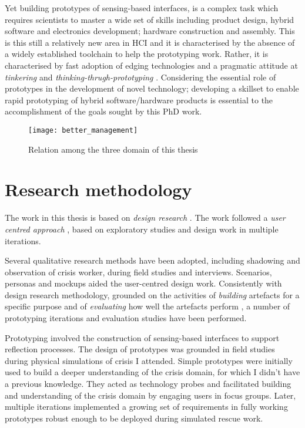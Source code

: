 Yet building prototypes of sensing-based interfaces, is a complex task which requires scientists to master a wide set of skills including product design, hybrid software and electronics development; hardware construction and assembly. This is this still a relatively new area in HCI and it is characterised by the absence of a widely established toolchain to help the prototyping work. Rather, it is characterised by fast adoption of edging technologies and a pragmatic attitude at \emph{tinkering} and \emph{thinking-thrugh-prototyping} \autocite{Klemmer:2006ez}. Considering the essential role of prototypes in the development of novel technology; developing a skillset to enable rapid prototyping of hybrid software/hardware products is essential to the accomplishment of the goals sought by this PhD work.
\begin{figure}
	[tbh] \centering 
	\texttt{[image: better\_management]} \caption{Relation among the three domain of this thesis} \label{fig:topic_relation} 
\end{figure}

\section{Research methodology}\label{research-methodology}

The work in this thesis is based on \emph{design research} \autocites{Hevner:2010gc}{March:1995gm}. The work followed a \emph{user centred approach} \autocites{MAGUIRE:2001dp}{Gulliksen:2003hd}, based on exploratory studies and design work in multiple iterations.

Several qualitative research methods \autocite{robson1993real} have been adopted, including shadowing and observation of crisis worker, during field studies and interviews. Scenarios, personas and mockups aided the user-centred design work. Consistently with design research methodology, grounded on the activities of \emph{building} artefacts for a specific purpose and of \emph{evaluating} how well the artefacts perform \autocite{March:1995gm}, a number of prototyping iterations and evaluation studies have been performed.

Prototyping involved the construction of sensing-based interfaces to support reflection processes. The design of prototypes was grounded in field studies during physical simulations of crisis I attended. Simple prototypes were initially used to build a deeper understanding of the crisis domain, for which I didn't have a previous knowledge. They acted as technology probes \autocite{Hutchinson:2003il} and facilitated building and understanding of the crisis domain by engaging users in focus groups. Later, multiple iterations implemented a growing set of requirements in fully working prototypes robust enough to be deployed during simulated rescue work.

